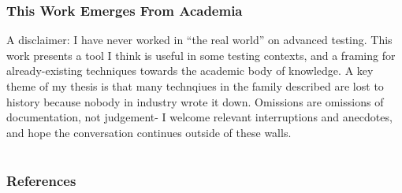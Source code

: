 \documentclass{beamer}
\begin{document}
\begin{frame}
  \frametitle{This Work Emerges From Academia}
  A disclaimer: I have never worked in ``the real world'' on advanced testing. This work presents a tool I think is useful in some testing contexts, and a framing for already-existing techniques towards the academic body of knowledge. A key theme of my thesis is that many technqiues in the family described are lost to history because nobody in industry wrote it down. Omissions are omissions of documentation, not judgement- I welcome relevant interruptions and anecdotes, and hope the conversation continues outside of these walls.
\end{frame}



\section{} %

\begin{frame}[t, allowframebreaks]
\frametitle{References}


\end{frame}
\end{document}
